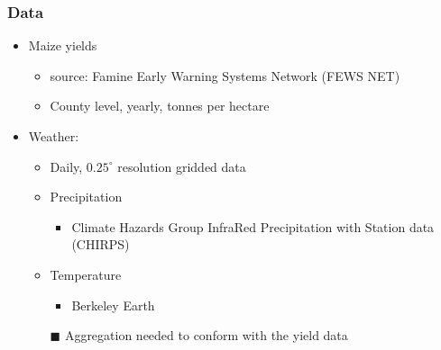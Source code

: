 \documentclass{beamer}              %
\begin{document}
\begin{frame}\label{Data}
\frametitle{Data} 

\begin{itemize}
\item Maize yields
\begin{itemize}
\item source: Famine Early Warning Systems Network (FEWS NET)
\item County level, yearly, tonnes per hectare
\end{itemize}
\item Weather:
\begin{itemize}
\item Daily, $0.25^{\circ}$ resolution gridded data
\item Precipitation
	\begin{itemize}
	\item Climate Hazards Group InfraRed Precipitation with Station data (CHIRPS)
	\end{itemize}
\item Temperature
	\begin{itemize}
	\item Berkeley Earth
	\end{itemize}
	\item[$\blacksquare$] Aggregation needed to conform with the yield data
\end{itemize}

\end{itemize}

\end{frame}


\end{document}
